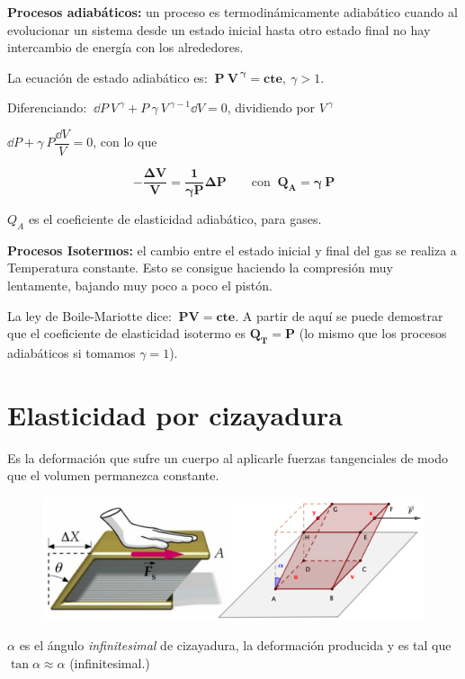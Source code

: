 \textbf{Procesos adiabáticos:} un proceso es termodinámicamente adiabático cuando al evolucionar un sistema desde un estado inicial hasta otro estado final no hay intercambio de energía con los alrededores.

La ecuación de estado adiabático es: $\ \boldsymbol{P \ V^{\ \gamma}=cte},\ \gamma>1$.

Diferenciando: $\ \dd P \ V^{\ \gamma}+ P \ \gamma \ V^{\ \gamma - 1} \dd V = 0$, dividiendo por $V^{\ \gamma}$

$\dd P + \gamma \ P \dfrac {\dd V}{V}=0 $, con lo que

$$\boldsymbol{-\dfrac{\Delta V}{V}=\dfrac {1}{\gamma P} \Delta P}\qquad \text{con } \  \boldsymbol{Q_A=\gamma \ P}$$

$Q_A$ es el coeficiente de elasticidad adiabático, para gases.

\textbf{Procesos Isotermos:} el cambio entre el estado inicial y final del gas se realiza a Temperatura constante. Esto se consigue haciendo la compresión muy lentamente, bajando muy poco a poco el pistón.

La ley de Boile-Mariotte dice: $\ \boldsymbol{PV=cte}$. A partir de aquí se puede demostrar que el coeficiente de elasticidad isotermo es $\boldsymbol{Q_T=P}$ (lo mismo que los procesos adiabáticos si tomamos $\gamma=1$).

\section{Elasticidad por cizayadura}

Es la deformación que sufre un cuerpo al aplicarle fuerzas tangenciales de modo que el volumen permanezca constante.

\begin{figure}[H]
	\centering
	\includegraphics[width=1\textwidth]{imagenes/imagenes09/T09IM04.png}
\end{figure}

 $\alpha$ es el ángulo \emph{infinitesimal} de cizayadura, la deformación producida y es tal que $\tan \alpha \approx \alpha$  \textcolor{gris}{(infinitesimal.)}
 
